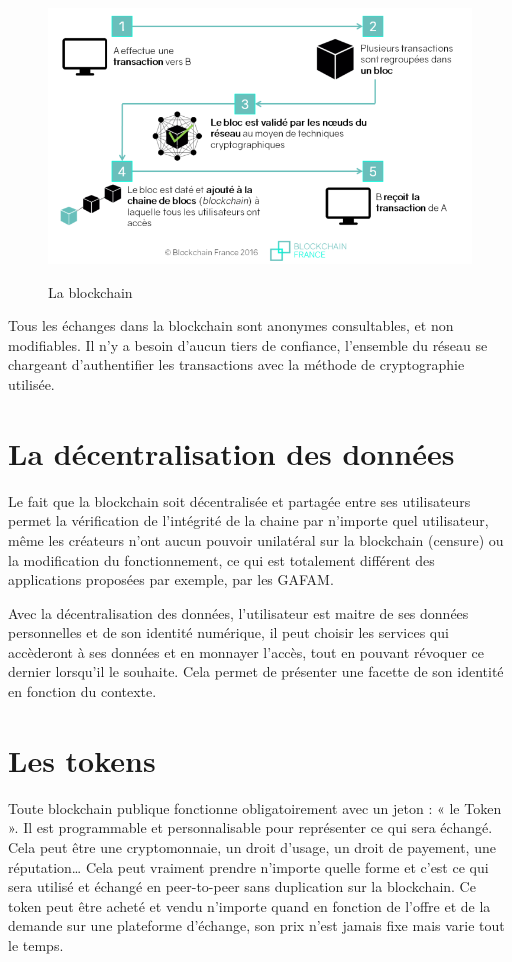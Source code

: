 \documentclass[12pt, a4paper, oneside]{book}
\begin{document}
\begin{figure}[H]
    \begin{center}
      \includegraphics[width=.55\textwidth]{images/blockchain.png}
      \label{fig:chaine}
      \caption{La blockchain}
    \end{center}
\end{figure}

Tous les échanges dans la blockchain sont anonymes consultables, et non modifiables. Il n'y a besoin d'aucun tiers de confiance, l’ensemble du réseau se chargeant d’authentifier les transactions avec la méthode de cryptographie utilisée.

\section{La décentralisation des données}
    Le fait que la blockchain soit décentralisée et partagée entre ses utilisateurs permet la vérification de l’intégrité de la chaine par n’importe quel utilisateur, même les créateurs n’ont aucun pouvoir unilatéral sur la blockchain (censure) ou la modification du fonctionnement, ce qui est totalement différent des applications proposées par exemple, par les GAFAM.

Avec la décentralisation des données, l’utilisateur est maitre de ses données personnelles et de son identité numérique, il peut choisir les services qui accèderont à ses données et en monnayer l’accès, tout en pouvant révoquer ce dernier lorsqu'il le souhaite. Cela permet de présenter une facette de son identité en fonction du contexte. 

\section{Les tokens}
Toute blockchain publique fonctionne obligatoirement avec un jeton : « le Token ». Il est programmable et personnalisable pour représenter ce qui sera échangé. Cela peut être une cryptomonnaie, un droit d’usage, un droit de payement, une réputation… Cela peut vraiment prendre n’importe quelle forme et c’est ce qui sera utilisé et échangé en peer-to-peer sans duplication sur la blockchain.
Ce token peut être acheté et vendu n’importe quand en fonction de l’offre et de la demande sur une plateforme d’échange, son prix n’est jamais fixe mais varie tout le temps. 
\end{document}
